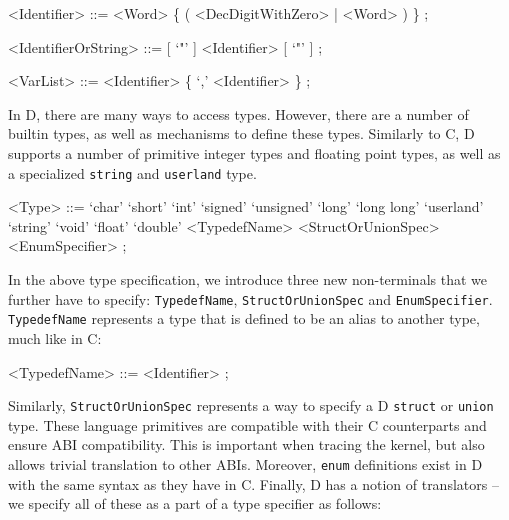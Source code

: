 \begin{grammar}
<Identifier> ::= <Word> \{ ( <DecDigitWithZero> | <Word> ) \} ;

<IdentifierOrString> ::= [ `"' ] <Identifier> [ `"' ] ;

<VarList> ::= <Identifier> \{ `,' <Identifier> \} ;
\end{grammar}

\noindent
In D, there are many ways to access types. However, there are a number of
builtin types, as well as mechanisms to define these types. Similarly to C, D
supports a number of primitive integer types and floating point types, as well
as a specialized \texttt{string} and \texttt{userland} type.

\begin{grammar}
<Type> ::=  `char'
       \alt `short'
       \alt `int'
       \alt `signed'
       \alt `unsigned'
       \alt `long'
       \alt `long long'
       \alt `userland'
       \alt `string'
       \alt `void'
       \alt `float'
       \alt `double'
       \alt <TypedefName>
       \alt <StructOrUnionSpec>
       \alt <EnumSpecifier> ;
\end{grammar}

\noindent
In the above type specification, we introduce three new non-terminals that we
further have to specify: \texttt{TypedefName}, \texttt{StructOrUnionSpec} and
\texttt{EnumSpecifier}.  \texttt{TypedefName} represents a type that is defined
to be an alias to another type, much like in C:

\begin{grammar}
<TypedefName> ::= <Identifier> ;
\end{grammar}

\noindent
Similarly, \texttt{StructOrUnionSpec} represents a way to specify a D
\texttt{struct} or \texttt{union} type. These language primitives are compatible
with their C counterparts and ensure ABI compatibility. This is important when
tracing the kernel, but also allows trivial translation to other ABIs. Moreover,
\texttt{enum} definitions exist in D with the same syntax as they have in C. Finally,
D has a notion of translators -- we specify all of these as a part of a type specifier
as follows:

